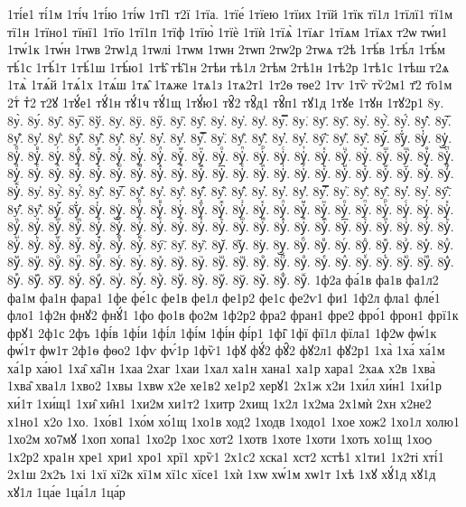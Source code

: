 {1ті́е1
ті́1м
1ті́ч
1ті́ю
1ті́ѡ
1ті̑1
т2ї
1тїа.
1тїе́
1тїею
1тїих
1тїй
1тїк
тї1л
1тїлї1
тї1м
тї1н
1тїно1
тїнї1
1тїо
1тї1п
1тїф
1тїю̀
1тїѐ
1тїѝ
1тїѧ̀
1тїѧг
1тїѧм
1тїѧх
т2ѡ
тѡ́и1
1тѡ́1к
1тѡ́н
1тѡв
2тѡ1д
1тѡлі
1тѡм
1тѡн
2тѡп
2тѡ2р
2тѡѧ
т2ѣ
1тѣ́в
1тѣ́л
1тѣ́м
тѣ́1с
1тѣ́1т
1тѣ́1ш
1тѣ́ю1
1тѣ̑
тѣ̑1н
2тѣи
тѣ1л
2тѣм
2тѣ1н
1тѣ2р
1тѣ1с
1тѣш
т2ѧ
1тѧ̀
1тѧ́й
1тѧ́1х
1тѧ́ш
1тѧ̑
1тѧже
1тѧ1з
1тѧ2т1
1т2ѳ
тѳе2
1тѵ
1тѷ
тѷ2м1
т҃2
т҃о1м
2тⷭ
тⷯ2
т2ꙋ
1тꙋ́е1
тꙋ́1н
тꙋ́1ч
тꙋ́1щ
1тꙋ́ю1
тꙋ̑2
тꙋ̑д1
тꙋ̑п1
тꙋ1д
1тꙋе
1тꙋн
1тꙋ2р1
8у.
8у̀.
8у́.
8у̂.
8у̅.
8ў.
8у̇.
8ӱ.
8ӳ.
8у̏.
8у̑.
8у̓.
8у̔.
8у̾.
8у̿.
8у͘.
8у҃.
8у҄.
8у҅.
8у҅̀.
8у҅́.
8у҅̂.
8у҅̅.
8у҅̆.
8у҅̇.
8у҅̈.
8у҅̋.
8у҅̏.
8у҅̑.
8у҅̓.
8у҅̔.
8у҅̾.
8у҅̿.
8у҅͘.
8у҅҃.
8у҅҄.
8у҅҅.
8у҅҆.
8у҅҇.
8у҅᷀.
8у҅᷁.
8у҅᷶.
8у᷷҅.
8у᷸҅.
8у᷹҅.
8у҅ⷠ.
8у҅ⷡ.
8у҅ⷢ.
8у҅ⷣ.
8у҅ⷤ.
8у҅ⷥ.
8у҅ⷦ.
8у҅ⷧ.
8у҅ⷨ.
8у҅ⷩ.
8у҅ⷪ.
8у҅ⷫ.
8у҅ⷬ.
8у҅ⷭ.
8у҅ⷮ.
8у҅ⷯ.
8у҅ⷰ.
8у҅ⷱ.
8у҅ⷲ.
8у҅ⷳ.
8у҅ⷴ.
8у҅ⷵ.
8у҅ⷶ.
8у҅ⷷ.
8у҅ⷸ.
8у҅ⷹ.
8у҅ⷺ.
8у҅ⷻ.
8у҅ⷼ.
8у҅ⷽ.
8у҅ⷾ.
8у҅ⷿ.
8у҅꙯.
8у҅ꙴ.
8у҅ꙵ.
8у҅ꙶ.
8у҅ꙷ.
8у҅ꙸ.
8у҅ꙹ.
8у҅ꙺ.
8у҅ꙻ.
8у҅꙼.
8у҅꙽.
8у҅ꚞ.
8у҅ꚟ.
8у҆.
8у҆̀.
8у҆́.
8у҆̂.
8у҆̅.
8у҆̆.
8у҆̇.
8у҆̈.
8у҆̋.
8у҆̏.
8у҆̑.
8у҆̓.
8у҆̔.
8у҆̾.
8у҆̿.
8у҆͘.
8у҆҃.
8у҆҄.
8у҆҅.
8у҆҆.
8у҆҇.
8у҆᷀.
8у҆᷁.
8у҆᷶.
8у᷷҆.
8у᷸҆.
8у᷹҆.
8у҆ⷠ.
8у҆ⷡ.
8у҆ⷢ.
8у҆ⷣ.
8у҆ⷤ.
8у҆ⷥ.
8у҆ⷦ.
8у҆ⷧ.
8у҆ⷨ.
8у҆ⷩ.
8у҆ⷪ.
8у҆ⷫ.
8у҆ⷬ.
8у҆ⷭ.
8у҆ⷮ.
8у҆ⷯ.
8у҆ⷰ.
8у҆ⷱ.
8у҆ⷲ.
8у҆ⷳ.
8у҆ⷴ.
8у҆ⷵ.
8у҆ⷶ.
8у҆ⷷ.
8у҆ⷸ.
8у҆ⷹ.
8у҆ⷺ.
8у҆ⷻ.
8у҆ⷼ.
8у҆ⷽ.
8у҆ⷾ.
8у҆ⷿ.
8у҆꙯.
8у҆ꙴ.
8у҆ꙵ.
8у҆ꙶ.
8у҆ꙷ.
8у҆ꙸ.
8у҆ꙹ.
8у҆ꙺ.
8у҆ꙻ.
8у҆꙼.
8у҆꙽.
8у҆ꚞ.
8у҆ꚟ.
8у҇.
8у᷀.
8у᷁.
8у᷶.
8у᷷.
8у᷸.
8у᷹.
8уⷠ.
8уⷡ.
8уⷢ.
8уⷣ.
8уⷤ.
8уⷥ.
8уⷦ.
8уⷧ.
8уⷨ.
8уⷩ.
8уⷪ.
8уⷫ.
8уⷬ.
8уⷭ.
8уⷮ.
8уⷯ.
8уⷰ.
8уⷱ.
8уⷲ.
8уⷳ.
8уⷴ.
8уⷵ.
8уⷶ.
8уⷷ.
8уⷸ.
8уⷹ.
8уⷺ.
8уⷻ.
8уⷼ.
8уⷽ.
8уⷾ.
8уⷿ.
8у꙯.
8уꙴ.
8уꙵ.
8уꙶ.
8уꙷ.
8уꙸ.
8уꙹ.
8уꙺ.
8уꙻ.
8у꙼.
8у꙽.
8уꚞ.
8уꚟ.
1ф2а
фа́1в
фа1в
фа1л2
фа1м
фа1н
фара1
1фе
фе́1с
фе1в
фе1л
фе1р2
фе1с
фе2ѵ1
фи1
1ф2л
фла1
фле́1
фло1
1ф2н
фнꙋ2
фнꙋ́1
1фо
фо1в
фо2м
1ф2р2
фра2
фран1
фре2
фро́1
фрон1
фрї1к
фрꙋ1
2ф1с
2фъ
1фі́в
1фі́и
1фі́л
1фі́м
1фі́н
фі́р1
1фі̑
1фї
фї1л
фїла1
1ф2ѡ
фѡ́1к
фѡ́1т
фѡ1т
2ф1ѳ
фѳо2
1фѵ
фѵ́1р
1фѷ1
1фꙋ
фꙋ́2
фꙋ̑2
фꙋ2л1
фꙋ2р1
1ха̀
1ха́
ха́1м
ха́1р
ха́ю1
1ха̑
ха̑1н
1хаа
2хаг
1хаи
1хал
ха1н
хана1
ха1р
хара1
2хаѧ
х2в
1хва̀
1хва̑
хва1л
1хво2
1хвы
1хвѡ
х2е
хе1в2
хе1р2
херꙋ1
2х1ж
х2и
1хи́л
хи́н1
1хи́1р
хи́1т
1хи́щ1
1хи̑
хи̑н1
1хи2м
хи1т2
1хитр
2хищ
1х2л
1х2ма
2х1мѝ
2хн
х2не2
х1но1
х2о
1хо.
1хо́в1
1хо́м
хо́1щ
1хо1в
ход2
1ходв
1ходо1
1хое
хож2
1хо1л
холю1
1хо2м
хо7мꙋ
1хоп
хопа1
1хо2р
1хос
хот2
1хотв
1хоте
1хоти
1хоть
хо1щ
1хоѻ
1х2р2
хра1н
хре1
хри1
хро1
хрї1
хрѷ1
2х1с2
хска1
хст2
хстѣ1
х1ти1
1х2ті
хті́1
2х1ш
2х2ъ
1хі
1хї
хї2к
хї1м
хї1с
хїсе1
1хѝ
1хѡ
хѡ́1м
хѡ1т
1хѣ
1хꙋ
хꙋ́1д
хꙋ1д
хꙋ1л
1ца́е
1ца́1л
1ца́р
}

